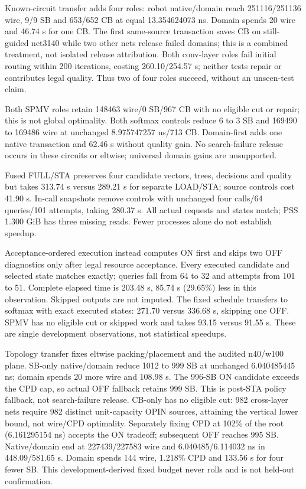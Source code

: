 \documentclass[conference,10pt]{IEEEtran}
\begin{document}
Known-circuit transfer adds four roles: robot native/domain reach 251116/251136 wire, 9/9 SB and 653/652 CB at equal 13.354624073 ns. Domain spends 20 wire and 46.74 s for one CB. The first same-source transaction saves CB on still-guided net3140 while two other nets release failed domains; this is a combined treatment, not isolated release attribution. Both conv-layer roles fail initial routing within 200 iterations, costing 260.10/254.57 s; neither tests repair or contributes legal quality. Thus two of four roles succeed, without an unseen-test claim.

Both SPMV roles retain 148463 wire/0 SB/967 CB with no eligible cut or repair; this is not global optimality. Both softmax controls reduce 6 to 3 SB and 169490 to 169486 wire at unchanged 8.975747257 ns/713 CB. Domain-first adds one native transaction and 62.46 s without quality gain. No search-failure release occurs in these circuits or eltwise; universal domain gains are unsupported.

Fused FULL/STA preserves four candidate vectors, trees, decisions and quality but takes 313.74 s versus 289.21 s for separate LOAD/STA; source controls cost 41.90 s. In-call snapshots remove controls with unchanged four calls/64 queries/101 attempts, taking 280.37 s. All actual requests and states match; PSS 1.300 GiB has three missing reads. Fewer processes alone do not establish speedup.

Acceptance-ordered execution instead computes ON first and skips two OFF diagnostics only after legal resource acceptance. Every executed candidate and selected state matches exactly; queries fall from 64 to 32 and attempts from 101 to 51. Complete elapsed time is 203.48 s, 85.74 s (29.65\%) less in this observation. Skipped outputs are not imputed. The fixed schedule transfers to softmax with exact executed states: 271.70 versus 336.68 s, skipping one OFF. SPMV has no eligible cut or skipped work and takes 93.15 versus 91.55 s. These are single development observations, not statistical speedups.

Topology transfer fixes eltwise packing/placement and the audited n40/w100 plane. SB-only native/domain reduce 1012 to 999 SB at unchanged 6.040485445 ns; domain spends 20 more wire and 108.98 s. The 996-SB ON candidate exceeds the CPD cap, so actual OFF fallback retains 999 SB. This is post-STA policy fallback, not search-failure release. CB-only has no eligible cut: 982 cross-layer nets require 982 distinct unit-capacity OPIN sources, attaining the vertical lower bound, not wire/CPD optimality. Separately fixing CPD at 102\% of the root (6.161295154 ns) accepts the ON tradeoff; subsequent OFF reaches 995 SB. Native/domain end at 227439/227583 wire and 6.040485/6.114032 ns in 448.09/581.65 s. Domain spends 144 wire, 1.218\% CPD and 133.56 s for four fewer SB. This development-derived fixed budget never rolls and is not held-out confirmation.
\end{document}

